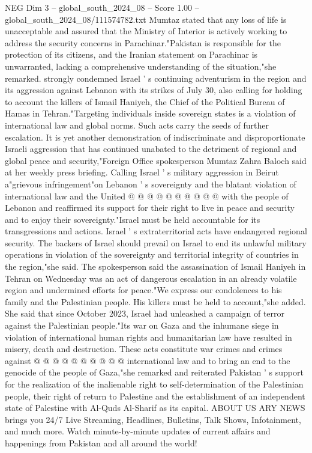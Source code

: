 \begin{textsample}{NEG Dim 3 – global\_south\_2024\_08 – Score 1.00 – global\_south\_2024\_08/111574782.txt}  \label{ex:f3_neg_128}
Mumtaz stated that any loss of life is unacceptable and assured that the Ministry of Interior is actively working to address the security concerns in Parachinar."Pakistan is responsible for the protection of its citizens, and the Iranian statement on Parachinar is unwarranted, lacking a comprehensive understanding of the situation,"she remarked. strongly condemned Israel ' s continuing adventurism in the region and its aggression against Lebanon with its strikes of July 30, also calling for holding to account the killers of Ismail Haniyeh, the Chief of the Political Bureau of Hamas in Tehran."Targeting individuals inside sovereign states is a violation of international law and global norms.
Such acts carry the seeds of further escalation.
It is yet another demonstration of indiscriminate and disproportionate Israeli aggression that has continued unabated to the detriment of regional and global peace and security,"Foreign Office spokesperson Mumtaz Zahra Baloch said at her weekly press briefing.
Calling Israel ' s military aggression in Beirut a"grievous infringement"on Lebanon ' s sovereignty and the blatant violation of international law and the United @ @ @ @ @ @ @ @ @ @ with the people of Lebanon and reaffirmed its support for their right to live in peace and security and to enjoy their sovereignty."Israel must be held accountable for its transgressions and actions.
Israel ' s extraterritorial acts have endangered regional security.
The backers of Israel should prevail on Israel to end its unlawful military operations in violation of the sovereignty and territorial integrity of countries in the region,"she said.
The spokesperson said the assassination of Ismail Haniyeh in Tehran on Wednesday was an act of dangerous escalation in an already volatile region and undermined efforts for peace."We express our condolences to his family and the Palestinian people.
His killers must be held to account,"she added.
She said that since October 2023, Israel had unleashed a campaign of terror against the Palestinian people."Its war on Gaza and the inhumane siege in violation of international human rights and humanitarian law have resulted in misery, death and destruction.
These acts constitute war crimes and crimes against @ @ @ @ @ @ @ @ @ @ international law and to bring an end to the genocide of the people of Gaza,"she remarked and reiterated Pakistan ' s support for the realization of the inalienable right to self-determination of the Palestinian people, their right of return to Palestine and the establishment of an independent state of Palestine with Al-Quds Al-Sharif as its capital.
ABOUT US ARY NEWS brings you 24/7 Live Streaming, Headlines, Bulletins, Talk Shows, Infotainment, and much more.
Watch minute-by-minute updates of current affairs and happenings from Pakistan and all around the world!

\end{textsample}
